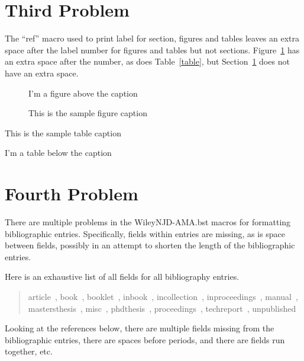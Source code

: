 \documentclass[AMA,STIX1COL]{WileyNJD-v2}
\begin{document}
\section{Third Problem}\label{section}

The ``ref'' macro used to print label for section, figures and tables leaves an extra space after the label number for figures and tables but not sections.
Figure~\ref{figure} has an extra space after the number, as does Table~\ref{table}, but Section~\ref{section} does not have an extra space.

\begin{figure}
\centering
I'm a figure above the caption
\caption{This is the sample figure caption}
\label{figure}
\end{figure}

\begin{table}
\caption{This is the sample table caption}
\label{table}
\centering
I'm a table below the caption
\end{table}


\section{Fourth Problem}

There are multiple problems in the WileyNJD-AMA.bst macros for formatting bibliographic entries.
Specifically, fields within entries are missing, as is space between fields, possibly in an attempt to shorten the length of the bibliographic entries.

Here is an exhaustive list of all fields for all bibliography entries.
\begin{quote}
article~\cite{article01}, book~\cite{book01}, booklet~\cite{booklet01}, inbook~\cite{inbook01}, incollection~\cite{incollection01}, inproceedings~\cite{inproceedings01}, manual~\cite{manual01}, mastersthesis~\cite{mastersthesis01}, misc~\cite{misc01}, phdthesis~\cite{phdthesis01}, proceedings~\cite{proceedings01}, techreport~\cite{techreport01}, unpublished~\cite{unpublished01}
\end{quote}
Looking at the references below, there are multiple fields missing from the bibliographic entries, there are spaces before periods, and there are fields run together, etc.









\nocite{*}%
%
\end{document}
